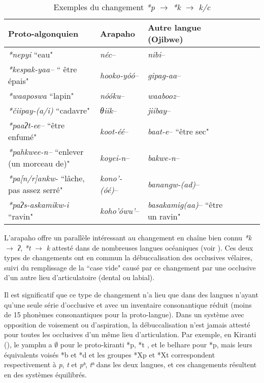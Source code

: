 \documentclass[twoside,a4paper,11pt]{article}
\newcommand{\ipa}[1]{{\phon\textit{#1}}}
\newcommand{\Σ}{\greek{Σ}}
\begin{document}
 \begin{table}[h]
\caption{Exemples du changement \ipa{*p} $\rightarrow$ \ipa{*k} $\rightarrow$  \ipa{k/c}} \centering  \label{tab:p.k}
\begin{tabular}{lllllll}
\toprule
Proto-algonquien & Arapaho & Autre langue (Ojibwe)\\
\midrule
  \ipa{*nepyi} ``eau" & \textit{néc}--    &  \textit{nibi}-- \\
 \ipa{*kespak-yaa--} `` être épais" & \textit{hooko-yóó}--    &  \textit{gipag-aa}-- \\
 \ipa{*waaposwa} ``lapin" & \textit{nóóku}--    &  \textit{waabooz}-- \\
  \ipa{*čiipay-(a/i)} ``cadavre" & \textit{θiik}--    &  \textit{jiibay}-- \\
  \ipa{*paaʔt-ee--} ``être enfumé" & \textit{koot-éé}--    &  \textit{baat-e}-- ``être sec"\\
    \ipa{*pahkwee-n--} ``enlever (un morceau de)" & \textit{koyei-n}--    &  \textit{bakwe-n}-- \\
        \ipa{*pa[n/r]ankw-} ``lâche, pas assez serré" & \textit{kono'-(óé)}--    &  \textit{banangw-(ad)}-- \\ 
   \ipa{*paʔs-askamikw-i} ``ravin" & \textit{koho'ówu'}--    &  \textit{basakamig(aa)}-- ``être un ravin"\\ 
\bottomrule
\end{tabular}
\end{table}

L'arapaho offre un parallèle intéressant au changement en chaîne bien connu \ipa{*k} $\rightarrow$ \ipa{ʔ},  \ipa{*t} $\rightarrow$ \ipa{k}  attesté dans de nombreuses langues océaniques (voir \citealt{blust04tk}). Ces deux types de changements ont en commun la débuccalisation des occlusives vélaires, suivi du remplissage de la ``case vide" causé par ce changement par une occlusive d'un autre lieu d'articulatoire (dental ou labial). 


Il est significatif que ce type de changement n'a lieu que dans des langues n'ayant qu'une seule série d'occlusive et avec un inventaire consonantique réduit (moins de 15 phonèmes consonantiques pour la proto-langue). Dans un système avec opposition de voisement ou d'aspiration, la débuccalisation n'est jamais attesté pour toutes les occlusives d'un même lieu d'articulation. Par exemple, en Kiranti (\citealt{michailovsky94stops}), le yamphu a $\emptyset$ pour le proto-kiranti *p, *t , et le belhare pour  *p, mais leurs équivalents voisés *b et *d et les groupes *Xp et *Xt correspondent respectivement à \ipa{p}, \ipa{t} et \ipa{pʰ}, \ipa{tʰ} dans les deux langues, et ces changements résultent en des systèmes équilibrés.
\end{document}
